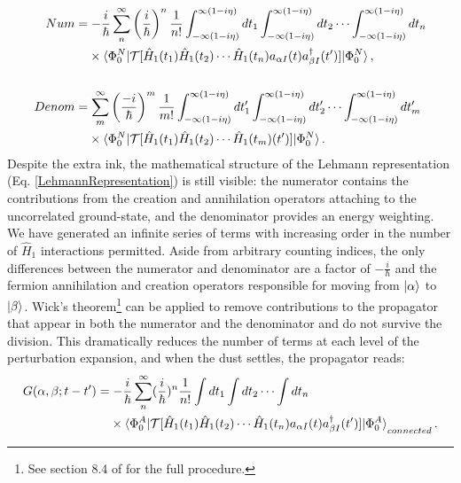 \begin{equation*}
    \begin{split}
        Num & = -\frac{i}{\hbar}\sum^{\infty}_{n}\left(\frac{i}{\hbar}\right)^{n}\frac{1}{n!}
    \int_{-\infty(1-i\eta)}^{\infty(1-i\eta)} dt_{1}
    \int_{-\infty(1-i\eta)}^{\infty(1-i\eta)} dt_{2} \cdots
    \int_{-\infty(1-i\eta)}^{\infty(1-i\eta)} dt_{n}\\
    & \phantom{ {}= } \times \braket{\Phi^{N}_{0}|\mathcal{T}[\hat{H}_{1}(t_{1})
    \hat{H}_{1}(t_{2}) \cdots \hat{H}_{1}(t_{n})a_{\alpha I}(t)a^{\dagger}_{\beta
    I}(t')]|\Phi^{N}_{0}},\\\\
    Denom & = \sum^{\infty}_{m}\left(\frac{-i}{\hbar}\right)^{m}\frac{1}{m!}
        \int_{-\infty(1-i\eta)}^{\infty(1-i\eta)} dt'_{1}
        \int_{-\infty(1-i\eta)}^{\infty(1-i\eta)} dt'_{2} \cdots
        \int_{-\infty(1-i\eta)}^{\infty(1-i\eta)} dt'_{m}\\
        & \phantom{ {}= } \times \braket{\Phi^{N}_{0}|
        \mathcal{T}[\hat{H}_{1}(t_{1})
        \hat{H}_{1}(t_{2}) \cdots \hat{H}_{1}(t_{m})(t')]|\Phi^{N}_{0}}.
    \end{split}
\end{equation*}
Despite the extra ink, the mathematical structure of the Lehmann
representation (Eq. \ref{LehmannRepresentation}) is still visible: the numerator contains
the contributions from the creation and annihilation operators attaching to the uncorrelated
ground-state, and the denominator provides an energy weighting. We have generated an infinite
series of terms with increasing order in the number of $\hat{H}_{1}$ interactions permitted.
Aside from arbitrary counting indices,
the only differences between the numerator and denominator are a
factor of $-\frac{i}{\hbar}$ and the fermion annihilation and creation operators
responsible for moving from $\ket{\alpha}$ to $\ket{\beta}$. Wick's
theorem\footnote{See section 8.4 of \cite{MBTE}
for the full procedure.} can be applied to remove contributions to the propagator
that appear in both the numerator and the denominator and do not survive the
division. This dramatically
reduces the number of terms at each level of the perturbation expansion, and when the dust settles,
the propagator reads:
\begin{equation} \label{ManyBodySPPropagatorConnected}
    \begin{split}
    G(\alpha, \beta; t-t') & =
    -\frac{i}{\hbar}\sum^{\infty}_{n}(\frac{i}{\hbar})^{n}
    \frac{1}{n!}\int dt_{1} \int dt_{2} \cdots \int dt_{n}\\
    & \phantom{ {}= } \times \braket{\Phi^{A}_{0}|
    \mathcal{T}[\hat{H}_{1}(t_{1})
    \hat{H}_{1}(t_{2}) \cdots
    \hat{H}_{1}(t_{n})a_{{\alpha}I}(t)a^{\dagger}_{{\beta}I}(t')]|\Phi^{A}_{0}}_{connected}.
\end{split}
\end{equation}

